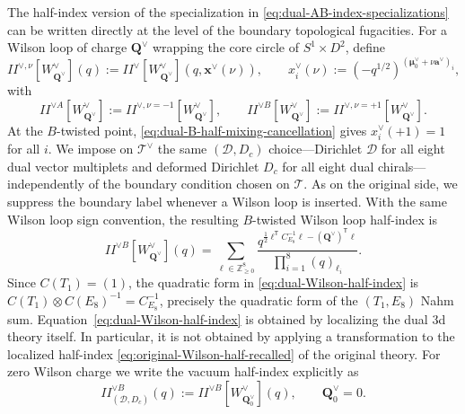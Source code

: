 \documentclass[11pt,a4paper]{article}
\numberwithin{equation}{section}
\begin{document}
The half-index version of the specialization in \eqref{eq:dual-AB-index-specializations} can be written directly at the level of the boundary topological fugacities.  For a Wilson loop of charge $\boldsymbol Q^\vee$ wrapping the core circle of $S^1\times D^2$, define
\begin{equation}
  I\!\!I^{\vee,\nu}[W^\vee_{\boldsymbol Q^\vee}](q)
  :=I\!\!I^{\vee}[W^\vee_{\boldsymbol Q^\vee}]
  \!\left(q,\boldsymbol x^\vee(\nu)\right),
  \qquad
  x_i^\vee(\nu)
  :=\left(-q^{1/2}\right)^{(\boldsymbol\mu_0^\vee+\nu\boldsymbol a^\vee)_i},
  \label{eq:dual-half-index-specialization}
\end{equation}
with
\begin{equation}
  I\!\!I^{\vee A}[W^\vee_{\boldsymbol Q^\vee}]
  :=I\!\!I^{\vee,\nu=-1}[W^\vee_{\boldsymbol Q^\vee}],
  \qquad
  I\!\!I^{\vee B}[W^\vee_{\boldsymbol Q^\vee}]
  :=I\!\!I^{\vee,\nu=+1}[W^\vee_{\boldsymbol Q^\vee}].
  \label{eq:dual-half-AB-specializations}
\end{equation}
At the $B$-twisted point, \eqref{eq:dual-B-half-mixing-cancellation} gives $x_i^\vee(+1)=1$ for all $i$.  We impose on $\mathcal T^\vee$ the same $(\mathcal D,D_c)$ choice---Dirichlet $\mathcal D$ for all eight dual vector multiplets and deformed Dirichlet $D_c$ for all eight dual chirals---independently of the boundary condition chosen on $\mathcal T$.  As on the original side, we suppress the boundary label whenever a Wilson loop is inserted.  With the same Wilson loop sign convention, the resulting $B$-twisted Wilson loop half-index is
\begin{equation}
  I\!\!I^{\vee B}[W^\vee_{\boldsymbol Q^\vee}](q)
  =
  \sum_{\boldsymbol\ell\in\mathbb Z_{\geq0}^{8}}
  \frac{
  q^{\frac12\boldsymbol\ell^{\mathsf T}C_{E_8}^{-1}\boldsymbol\ell
  -(\boldsymbol Q^\vee)^{\mathsf T}\boldsymbol\ell}
  }{
  \prod_{i=1}^{8}(q)_{\ell_i}
  }.
  \label{eq:dual-Wilson-half-index}
\end{equation}
Since $C(T_1)=(1)$, the quadratic form in \eqref{eq:dual-Wilson-half-index} is
$C(T_1)\otimes C(E_8)^{-1}=C_{E_8}^{-1}$, precisely the quadratic form of the $(T_1,E_8)$ Nahm sum.
Equation~\eqref{eq:dual-Wilson-half-index} is obtained by localizing the dual 3d theory itself.  In particular, it is not obtained by applying a transformation to the localized half-index \eqref{eq:original-Wilson-half-recalled} of the original theory.  For zero Wilson charge we write the vacuum half-index explicitly as
\begin{equation}
  I\!\!I_{(\mathcal D,D_c)}^{\vee B}(q)
  :=I\!\!I^{\vee B}[W^\vee_{\boldsymbol Q_0^\vee}](q),
  \qquad \boldsymbol Q_0^\vee=0.
  \label{eq:dual-vacuum-DDc-half-index}
\end{equation}
\end{document}
